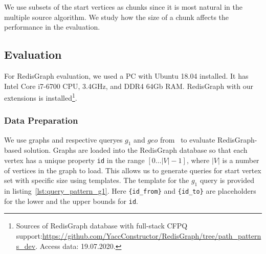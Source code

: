 We use subsets of the start vertices as chunks since it is most natural in the multiple source algorithm.
We study how the size of a chunk affects the performance in the evaluation.

\subsection{Evaluation}

For RedisGraph evaluation, we used a PC with Ubuntu 18.04 installed.
It has Intel Core i7-6700 CPU, 3.4GHz, and DDR4 64Gb RAM.
RedisGraph with our extensions is installed\footnote{Sources of RedisGraph database with full-stack CFPQ support:\url{https://github.com/YaccConstructor/RedisGraph/tree/path_patterns_dev}. Access data: 19.07.2020.}.

\subsubsection{Data Preparation}

We use graphs and respective queryes $g_1$ and $geo$ from~\cite{10.1145/3398682.3399163} to evaluate RedisGraph-based solution.
Graphs are loaded into the RedisGraph database so that each vertex has a unique property \verb|id| in the range $[0 \ldots |V|-1]$, where $|V|$ is a number of vertices in the graph to load.
This allows us to generate queries for start vertex set with specific size using templates.
The template for the $g_1$ query is provided in listing~\ref{lst:query_pattern_g1}.
Here \texttt{\{id\_from\}} and \texttt{\{id\_to\}} are placeholders for the lower and the upper bounds for \verb|id|.

\begin{algorithm}
\end{algorithm}


